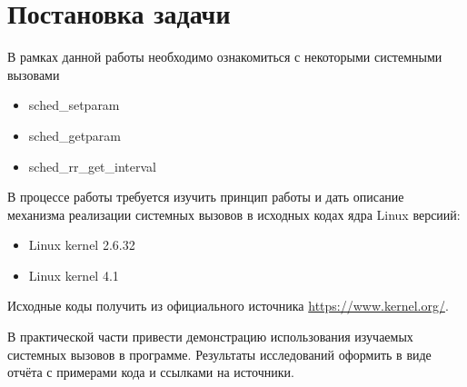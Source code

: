 \section*{Постановка задачи}

\vspace{2em}

В рамках данной работы необходимо ознакомиться с некоторыми системными вызовами
\begin{itemize}
\item sched\_setparam
\item sched\_getparam
\item sched\_rr\_get\_interval
\end{itemize}

\vspace{1em}

В процессе работы требуется изучить принцип работы и дать описание механизма реализации системных вызовов в исходных кодах ядра Linux версиий:

\begin{itemize}
\item Linux kernel 2.6.32
\item Linux kernel 4.1
\end{itemize}

Исходные коды получить из официального источника \url{https://www.kernel.org/}.

\vspace{2em}

В практической части привести демонстрацию использования изучаемых системных вызовов в программе. Результаты исследований оформить в виде отчёта с примерами кода и ссылками на источники.
